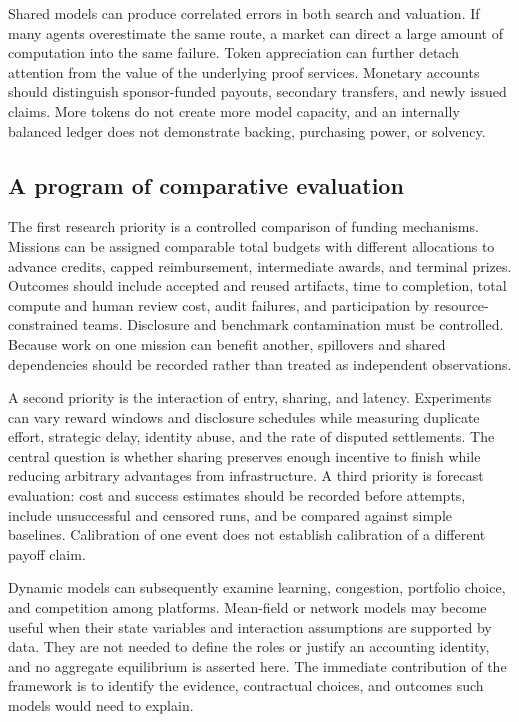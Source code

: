 \documentclass[11pt,a4paper]{article}
\begin{document}
Shared models can produce correlated errors in both search and valuation. If many agents overestimate the same route, a market can direct a large amount of computation into the same failure. Token appreciation can further detach attention from the value of the underlying proof services. Monetary accounts should distinguish sponsor-funded payouts, secondary transfers, and newly issued claims. More tokens do not create more model capacity, and an internally balanced ledger does not demonstrate backing, purchasing power, or solvency.

\subsection{A program of comparative evaluation}
The first research priority is a controlled comparison of funding mechanisms. Missions can be assigned comparable total budgets with different allocations to advance credits, capped reimbursement, intermediate awards, and terminal prizes. Outcomes should include accepted and reused artifacts, time to completion, total compute and human review cost, audit failures, and participation by resource-constrained teams. Disclosure and benchmark contamination must be controlled. Because work on one mission can benefit another, spillovers and shared dependencies should be recorded rather than treated as independent observations.

A second priority is the interaction of entry, sharing, and latency. Experiments can vary reward windows and disclosure schedules while measuring duplicate effort, strategic delay, identity abuse, and the rate of disputed settlements. The central question is whether sharing preserves enough incentive to finish while reducing arbitrary advantages from infrastructure. A third priority is forecast evaluation: cost and success estimates should be recorded before attempts, include unsuccessful and censored runs, and be compared against simple baselines. Calibration of one event does not establish calibration of a different payoff claim.

Dynamic models can subsequently examine learning, congestion, portfolio choice, and competition among platforms. Mean-field or network models may become useful when their state variables and interaction assumptions are supported by data. They are not needed to define the roles or justify an accounting identity, and no aggregate equilibrium is asserted here. The immediate contribution of the framework is to identify the evidence, contractual choices, and outcomes such models would need to explain.
\end{document}
